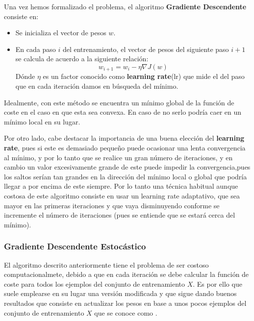         \noindent Una vez hemos formalizado el problema, el algoritmo \textbf{Gradiente Descendente} consiste en: 

        \begin{itemize}
            \item Se inicializa el vector de pesos $w$.
            \item En cada paso $i$ del entrenamiento, el vector de pesos del siguiente paso $i+1$ se calcula de acuerdo a la siguiente relación: 
            \begin{equation}
                w_{i+1}=w_i-\eta \nabla J(w)
            \end{equation}
            \noindent Dónde $\eta$ es un factor conocido como \textbf{learning rate}(lr) que mide el  del paso que en cada iteración damos en búsqueda del mínimo. 
        \end{itemize}

        \noindent Idealmente, con este método se encuentra un mínimo global de la función de coste en el caso en que esta sea convexa. En caso de no serlo podría caer en un mínimo local en su lugar. 

        \medskip

        \noindent Por otro lado, cabe destacar la importancia de una buena elección del \textbf{learning rate}, pues si este es demasiado pequeño puede ocasionar una lenta convergencia al mínimo, y por lo tanto que se realice un gran número de iteraciones, y en cambio un valor excesivamente grande de este puede impedir la convergencia,pues los saltos serían tan grandes en la dirección del mínimo local o global que podría llegar a  por encima de este siempre. Por lo tanto una técnica habitual aunque costosa de este algoritmo consiste en usar un learning rate adaptativo, que sea mayor en las primeras iteraciones y que vaya disminuyendo conforme se incremente el número de iteraciones (pues se entiende que se estará cerca del mínimo).

        \subsubsection{Gradiente Descendente Estocástico}

            \noindent El algoritmo descrito anteriormente tiene el problema de ser costoso computacionalmete, debido a que en cada iteración se debe calcular la función de coste para todos los ejemplos del conjunto de entrenamiento $X$. Es por ello que suele emplearse en su lugar una versión modificada y que sigue dando buenos resultados que consiste en actualizar los pesos en base a unos pocos ejemplos del conjunto de entrenamiento $X$ que se conoce como .




